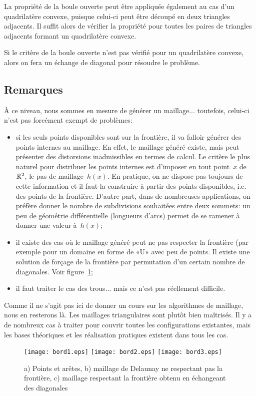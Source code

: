 \medskip
La propriété de la boule ouverte peut être appliquée également au cas d'un quadrilatère convexe, puisque celui-ci peut être découpé en deux triangles adjacents. Il suffit alors de vérifier la propriété pour toutes les paires de triangles adjacents formant un quadrilatère convexe.

Si le critère de la boule ouverte n'est pas vérifié pour un quadrilatère convexe, alors on fera un échange de diagonal pour résoudre le problème.

\medskip
\subsection{Remarques}

À ce niveau, nous sommes en mesure de générer un maillage... toutefois, celui-ci n'est pas forcément exempt de problèmes:
\begin{itemize}
   \item si les seuls points disponibles sont sur la frontière, il va falloir générer des points internes au maillage. En effet, le maillage généré existe, mais peut présenter des distorsions inadmissibles en termes de calcul. Le critère le plus naturel pour distribuer les points internes est d'imposer en tout point~$x$ de~$\mathbb R^2$, le pas de maillage~$h(x)$. En pratique, on ne dispose pas toujours de cette information et il faut la construire à partir des points disponibles, i.e. des points de la frontière. D'autre part, dans de nombreuses applications, on préfère donner le nombre de subdivisions souhaitées entre deux sommets: un peu de géométrie différentielle (longueurs d'arcs) permet de se ramener à donner une valeur à~$h(x)$;
   \item il existe des cas où le maillage généré peut ne pas respecter la frontière (par exemple pour un domaine en forme de «U» avec peu de points. Il existe une solution de forçage de la frontière par permutation d'un certain nombre de diagonales. Voir figure~\ref{Fig-Mbord};
   \item il faut traiter le cas des trous... mais ce n'est pas réellement difficile.
\end{itemize}
Comme il ne s'agit pas ici de donner un cours sur les algorithmes de maillage, nous en resterons là. Les maillages triangulaires sont plutôt bien maîtrisés. Il y a de nombreux cas à traiter pour couvrir toutes les configurations existantes, mais les bases théoriques et les réalisation pratiques existent dans tous les cas.
\begin{figure}[htb]
\begin{center}
\texttt{[image: bord1.eps]} \hspace{2em} \texttt{[image: bord2.eps]} \hspace{2em} \texttt{[image: bord3.eps]}
\end{center}
\caption{a) Points et arêtes, b) maillage de Delaunay ne respectant pas la frontière, c) maillage respectant la frontière obtenu en échangeant des diagonales}\label{Fig-Mbord}
\end{figure}


